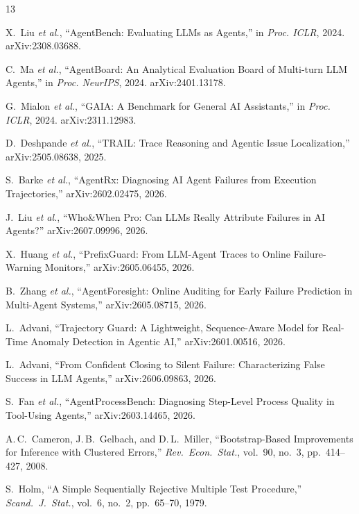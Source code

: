 \documentclass[conference]{IEEEtran}
\begin{document}
\begin{thebibliography}{13}

 X.~Liu \textit{et al.}, ``AgentBench: Evaluating LLMs as
Agents,'' in \textit{Proc. ICLR}, 2024. arXiv:2308.03688.

 C.~Ma \textit{et al.}, ``AgentBoard: An Analytical
Evaluation Board of Multi-turn LLM Agents,'' in \textit{Proc. NeurIPS},
2024. arXiv:2401.13178.

 G.~Mialon \textit{et al.}, ``GAIA: A Benchmark for General
AI Assistants,'' in \textit{Proc. ICLR}, 2024. arXiv:2311.12983.

 D.~Deshpande \textit{et al.}, ``TRAIL: Trace Reasoning and
Agentic Issue Localization,'' arXiv:2505.08638, 2025.

 S.~Barke \textit{et al.}, ``AgentRx: Diagnosing AI Agent
Failures from Execution Trajectories,'' arXiv:2602.02475, 2026.

 J.~Liu \textit{et al.}, ``Who\&When Pro: Can LLMs Really
Attribute Failures in AI Agents?'' arXiv:2607.09996, 2026.

 X.~Huang \textit{et al.}, ``PrefixGuard: From LLM-Agent
Traces to Online Failure-Warning Monitors,'' arXiv:2605.06455, 2026.

 B.~Zhang \textit{et al.}, ``AgentForesight: Online Auditing
for Early Failure Prediction in Multi-Agent Systems,''
arXiv:2605.08715, 2026.

 L.~Advani, ``Trajectory Guard: A Lightweight,
Sequence-Aware Model for Real-Time Anomaly Detection in Agentic AI,''
arXiv:2601.00516, 2026.

 L.~Advani, ``From Confident Closing to Silent Failure:
Characterizing False Success in LLM Agents,'' arXiv:2606.09863, 2026.

 S.~Fan \textit{et al.}, ``AgentProcessBench: Diagnosing
Step-Level Process Quality in Tool-Using Agents,'' arXiv:2603.14465,
2026.

 A.\,C.~Cameron, J.\,B.~Gelbach, and D.\,L.~Miller,
``Bootstrap-Based Improvements for Inference with Clustered Errors,''
\textit{Rev.\ Econ.\ Stat.}, vol.~90, no.~3, pp.~414--427, 2008.

 S.~Holm, ``A Simple Sequentially Rejective Multiple Test
Procedure,'' \textit{Scand.\ J.\ Stat.}, vol.~6, no.~2, pp.~65--70,
1979.

\end{thebibliography}
\end{document}
